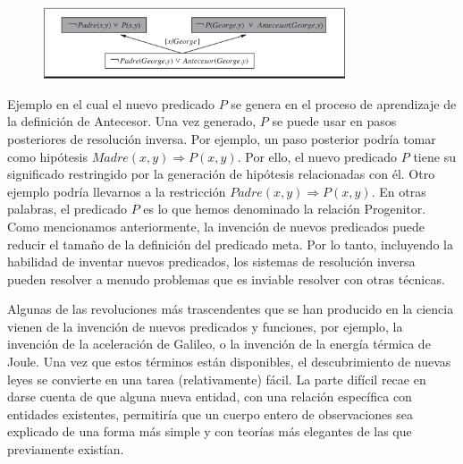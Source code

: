 \documentclass[12 pt, a4paper]{article}
\begin{document}
				\begin{figure}[h]
					\centering
					\includegraphics[width=0.8\textwidth]{./section3/fig10.png}
				\end{figure}
				Ejemplo en el cual el nuevo predicado $P$ se genera en el proceso de aprendizaje de la definición de Antecesor. Una vez generado, $P$ se puede usar en pasos posteriores de resolución inversa. Por ejemplo, un paso posterior podría tomar como hipótesis $Madre(x, y) \Rightarrow P(x, y)$. Por ello, el nuevo predicado $P$ tiene su significado restringido por la generación de hipótesis relacionadas con él. Otro ejemplo podría llevarnos a la restricción $Padre(x, y)\Rightarrow P(x, y)$. En otras palabras, el predicado $P$ es lo que hemos denominado la relación Progenitor. Como mencionamos anteriormente, la invención de nuevos predicados puede reducir el tamaño de la definición del predicado meta. Por lo tanto, incluyendo la habilidad de inventar nuevos predicados, los sistemas de resolución inversa pueden resolver a menudo problemas que es inviable resolver con otras técnicas.
				
				Algunas de las revoluciones más trascendentes que se han producido en la ciencia
vienen de la invención de nuevos predicados y funciones, por ejemplo, la invención de la aceleración de Galileo, o la invención de la energía térmica de Joule. Una vez que estos términos están disponibles, el descubrimiento de nuevas leyes se convierte en una tarea (relativamente) fácil. La parte difícil recae en darse cuenta de que alguna nueva entidad, con una relación específica con entidades existentes, permitiría que un cuerpo entero de observaciones sea explicado de una forma más simple y con teorías más elegantes de las que previamente existían.
\end{document}
